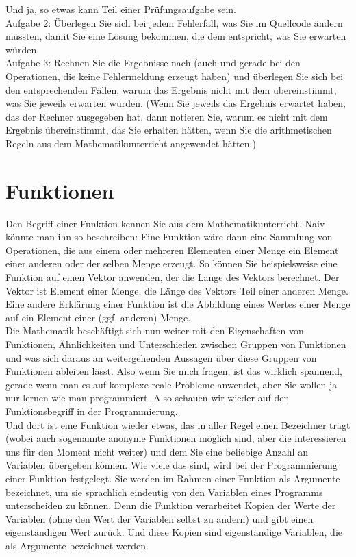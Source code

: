 Und ja, so etwas kann Teil einer Prüfungsaufgabe sein.\\

Aufgabe 2: Überlegen Sie sich bei jedem Fehlerfall, was Sie im Quellcode ändern müssten, damit Sie eine Lösung bekommen, die dem entspricht, was Sie erwarten würden.\\

Aufgabe 3: Rechnen Sie die Ergebnisse nach (auch und gerade bei den Operationen, die keine Fehlermeldung erzeugt haben) und überlegen Sie sich bei den entsprechenden Fällen, warum das Ergebnis nicht mit dem übereinstimmt, was Sie jeweils erwarten würden. (Wenn Sie jeweils das Ergebnis erwartet haben, das der Rechner ausgegeben hat, dann notieren Sie, warum es nicht mit dem Ergebnis übereinstimmt, das Sie erhalten hätten, wenn Sie die arithmetischen Regeln aus dem Mathematikunterricht angewendet hätten.)

\section{Funktionen}

Den Begriff einer Funktion kennen Sie aus dem Mathematikunterricht. Naiv könnte man ihn so beschreiben: Eine Funktion wäre dann eine Sammlung von Operationen, die aus einem oder mehreren Elementen einer Menge ein Element einer anderen oder der selben Menge erzeugt. So können Sie beispielsweise eine Funktion auf einen Vektor anwenden, der die Länge des Vektors berechnet. Der Vektor ist Element einer Menge, die Länge des Vektors Teil einer anderen Menge.\\

Eine andere Erklärung einer Funktion ist die Abbildung eines Wertes einer Menge auf ein Element einer (ggf. anderen) Menge.\\

Die Mathematik beschäftigt sich nun weiter mit den Eigenschaften von Funktionen, Ähnlichkeiten und Unterschieden zwischen Gruppen von Funktionen und was sich daraus an weitergehenden Aussagen über diese Gruppen von Funktionen ableiten lässt. Also wenn Sie mich fragen, ist das wirklich spannend, gerade wenn man es auf komplexe reale Probleme anwendet, aber Sie wollen ja nur lernen wie man programmiert. Also schauen wir wieder auf den Funktionsbegriff in der Programmierung.\\

Und dort ist eine Funktion wieder etwas, das in aller Regel einen Bezeichner trägt (wobei auch sogenannte anonyme Funktionen möglich sind, aber die interessieren uns für den Moment nicht weiter) und dem Sie eine beliebige Anzahl an Variablen übergeben können. Wie viele das sind, wird bei der Programmierung einer Funktion festgelegt. Sie werden im Rahmen einer Funktion als Argumente bezeichnet, um sie sprachlich eindeutig von den Variablen eines Programms unterscheiden zu können. Denn die Funktion verarbeitet Kopien der Werte der Variablen (ohne den Wert der Variablen selbst zu ändern) und gibt einen eigenständigen Wert zurück. Und diese Kopien sind eigenständige Variablen, die als Argumente bezeichnet werden.\\

